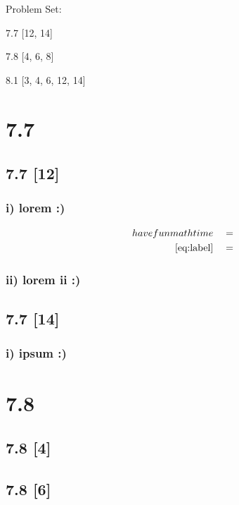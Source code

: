 \documentclass{article}
\begin{document}
{\large \noindent Problem Set:}

\par 7.7 [12, 14]
\par 7.8 [4, 6, 8]
\par 8.1 [3, 4, 6, 12, 14]
\vspace{5mm}

\noindent \hrulefill

\section*{7.7}
\setcounter{equation}{0}

\subsection*{7.7 [12]}

\subsubsection*{i) lorem :)}

\begin{align}
    \label{eq:label}
    have fun math time && &=
    \\
    \label{eq:label2}
    \eqref{eq:label} && &=
\end{align}
\subsubsection*{ii) lorem ii :)}

\subsection*{7.7 [14]}

\subsubsection*{i) ipsum :)}

\newpage

\section*{7.8}
\setcounter{equation}{0}

\subsection*{7.8 [4]}
\subsection*{7.8 [6]}
\end{document}
